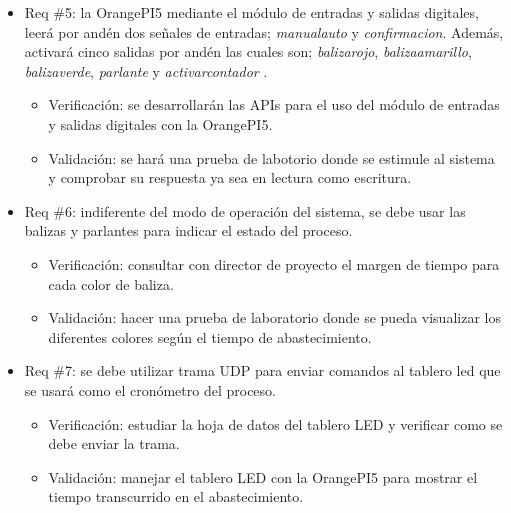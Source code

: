 \documentclass[
11pt, %
]{charter}
\begin{document}
\begin{itemize} 
\item Req \#5: la OrangePI5 mediante el módulo de entradas y salidas digitales, leerá por andén dos señales de entradas; \textit{manualauto} y \textit{confirmacion}.  Además, activará cinco salidas por andén las cuales son; \textit{balizarojo}, \textit{balizaamarillo}, \textit{balizaverde}, \textit{parlante} y \textit{activarcontador} .
\begin{itemize}
		\item Verificación: se desarrollarán las APIs para el uso del módulo de entradas y salidas digitales con la OrangePI5. 
		\item Validación: se hará una prueba de labotorio donde se estimule al sistema y comprobar su respuesta ya sea en lectura como escritura.  
	\end{itemize}
	
	\end{itemize}

\begin{itemize} 
\item Req \#6: indiferente del modo de operación del sistema, se debe usar las balizas y parlantes para indicar el estado del proceso.
\begin{itemize}
		\item Verificación: consultar con director de proyecto el margen de tiempo para cada color de baliza. 
		\item Validación: hacer una prueba de laboratorio donde se pueda visualizar los diferentes colores según el tiempo de abastecimiento.  
	\end{itemize}
	
	\end{itemize}


\begin{itemize} 
\item Req \#7: se debe utilizar trama UDP para enviar comandos al tablero led que se usará como el cronómetro del proceso.
\begin{itemize}
		\item Verificación: estudiar la hoja de datos del tablero LED y verificar como se debe enviar la trama. 
		\item Validación: manejar el tablero LED con la OrangePI5 para mostrar el tiempo transcurrido en el abastecimiento.  
	\end{itemize}
	
	\end{itemize}
\end{document}
